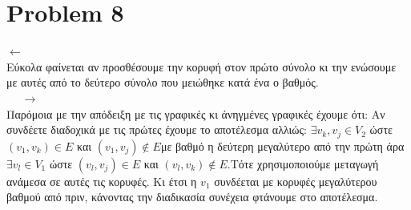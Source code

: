 \documentclass{article}
\begin{document}
\section*{Problem 8}
$\leftarrow$ \\
Εύκολα φαίνεται αν προσθέσουμε την κορυφή στον πρώτο σύνολο κι την ενώσουμε με αυτές από το δεύτερο σύνολο που μειώθηκε κατά ένα ο βαθμός.\\
$\ \  \ \ \ \ \rightarrow$\\
Παρόμοια με την απόδειξη με τις γραφικές κι άνηγμένες γραφικές έχουμε ότι: Αν συνδέετε διαδοχικά με τις πρώτες έχουμε το αποτέλεσμα αλλιώς: 
$\exists v_k,v_j \in V_2$ ώστε $(v_1,v_k)\in E$ και  $(v_1,v_j)\notin E$με βαθμό η δεύτερη μεγαλύτερο από την πρώτη άρα $\exists v_l \in V_1$ ώστε $(v_l,v_j)\in E$ και  $(v_l,v_k)\notin E$.Τότε χρησιμοποιούμε μεταγωγή ανάμεσα σε αυτές τις κορυφές. Κι έτσι η $v_1$ συνδέεται με κορυφές μεγαλύτερου βαθμού από πριν, κάνοντας την διαδικασία συνέχεια φτάνουμε στο αποτέλεσμα.
\end{document}
